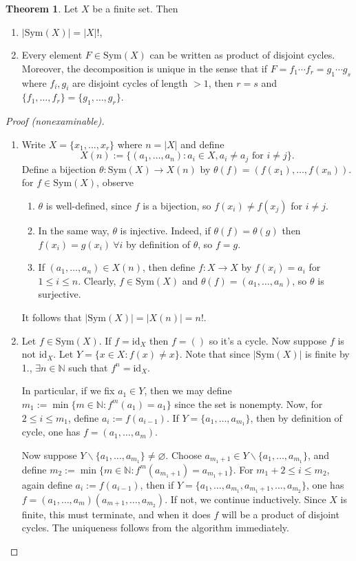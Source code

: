 \documentclass[a4paper]{article}
\newcommand{\N}{\mathbb{N}}
\newcommand{\Sym}{\text{Sym}}
\newcommand{\id}{\text{id}}
\theoremstyle{definition}
\newtheorem{thm}[defn]{Theorem}
\begin{document}
\begin{thm}
Let $X$ be a finite set. Then
\begin{enumerate}
\item $|\Sym(X)|=|X|!$,
\item Every element $F\in \Sym(X)$ can be written as product of disjoint cycles. Moreover, the decomposition is unique in the sense that if $F=f_1\cdots f_r=g_1\cdots g_s$ where $f_i,g_i$ are disjoint cycles of length $>1$, then $r=s$ and $\{f_1,\ldots,f_r\}=\{g_1,\ldots,g_r\}$.
\end{enumerate}
\end{thm}
\begin{proof}[Proof (nonexaminable)]
\begin{enumerate}
\item Write $X=\{x_1,\ldots,x_r\}$ where $n=|X|$ and define
\[
X(n):=\{(a_1,\ldots,a_n):a_i\in X, a_i\neq a_j \text{ for } i\neq j\}.
\]
Define a bijection $\theta:\Sym(X)\rightarrow X(n)$ by $\theta(f)=(f(x_1),\ldots,f(x_n))$. for $f\in \Sym(X)$, observe
\begin{enumerate}
\item $\theta$ is well-defined, since $f$ is a bijection, so $f(x_i)\neq f(x_j)$ for $i\neq j$.
\item In the same way, $\theta$ is injective. Indeed, if $\theta(f)=\theta(g)$ then $f(x_i)=g(x_i) \ \forall i$ by definition of $\theta$, so $f=g$.
\item If $(a_1,\ldots,a_n)\in X(n)$, then define $f:X\rightarrow X$ by $f(x_i)=a_i$ for $1\leq i\leq n$. Clearly, $f\in \Sym(X)$ and $\theta(f) = (a_1,\ldots,a_n)$, so $\theta$ is surjective.
\end{enumerate}
It follows that $|\Sym(X)|=|X(n)|=n!$.
\item Let $f\in\Sym(X)$. If $f=\id_X$ then $f=()$ so it's a cycle. Now suppose $f$ is not $\id_X$. Let $Y=\{x\in X:f(x)\neq x\}$. Note that since $|\Sym(X)|$ is finite by 1., $\exists n\in \N$ such that $f^n=\id_X$.

In particular, if we fix $a_1\in Y$, then we may define $m_1:=\min\{m\in \N:f^m(a_1)=a_1\}$ since the set is nonempty. Now, for $2\leq i\leq m_1$, define $a_i:=f(a_{i-1})$. If $Y=\{a_1,\ldots,a_{m_1}\}$, then by definition of cycle, one has $f=(a_1,\ldots,a_m)$.

Now suppose $Y\backslash \{a_1,\ldots,a_{m_1}\}\neq \varnothing$. Choose $a_{m_1+1} \in Y\backslash \{a_1,\ldots,a_{m_1}\}$, and define $m_2:=\min\{m\in \N:f^m(a_{m_1+1})=a_{m_1+1}\}$. For $m_1+2\leq i\leq m_2$, again define $a_i:=f(a_{i-1})$, then if $Y=\{a_1,\ldots,a_{m_1},a_{m_1+1},\ldots,a_{m_2}\}$, one has $f=(a_1,\ldots,a_m)(a_{m+1},\ldots,a_{m_2})$. If not, we continue inductively. Since $X$ is finite, this must terminate, and when it does $f$ will be a product of disjoint cycles. The uniqueness follows from the algorithm immediately.
\end{enumerate}
\end{proof}
\end{document}
